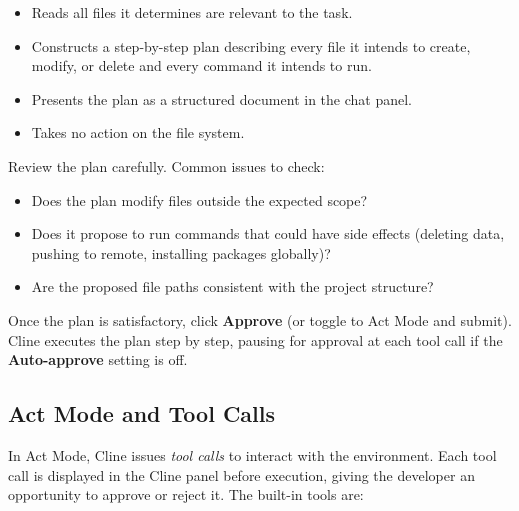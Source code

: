\begin{itemize}
  \item Reads all files it determines are relevant to the task.
  \item Constructs a step-by-step plan describing every file it intends to
        create, modify, or delete and every command it intends to run.
  \item Presents the plan as a structured document in the chat panel.
  \item Takes no action on the file system.
\end{itemize}

Review the plan carefully.  Common issues to check:
\begin{itemize}
  \item Does the plan modify files outside the expected scope?
  \item Does it propose to run commands that could have side effects
        (deleting data, pushing to remote, installing packages globally)?
  \item Are the proposed file paths consistent with the project structure?
\end{itemize}

Once the plan is satisfactory, click \textbf{Approve} (or toggle to Act Mode
and submit).  Cline executes the plan step by step, pausing for approval
at each tool call if the \textbf{Auto-approve} setting is off.

\subsection{Act Mode and Tool Calls}
\label{app:cline:act-mode}

In Act Mode, Cline issues \emph{tool calls} to interact with the environment.
Each tool call is displayed in the Cline panel before execution, giving the
developer an opportunity to approve or reject it.  The built-in tools are:

